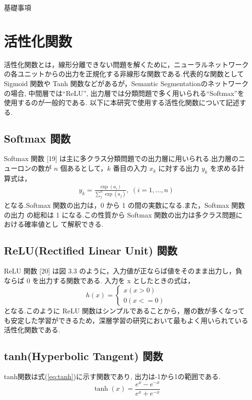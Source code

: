 \appendix
\begin{chapter}{基礎事項}
\section{活性化関数}\label{hu:ac_fn}
活性化関数とは，線形分離できない問題を解くために，ニューラルネットワークの各ユニットからの出力を正規化する非線形な関数である.代表的な関数として Sigmoid 関数や Tanh 関数などがあるが，Semantic Segmentationのネットワークの場合, 中間層では``ReLU''\cite{relu}, 出力層では分類問題で多く用いられる``Softmax''\cite{softmax}を使用するのが一般的である. 以下に本研究で使用する活性化関数について記述する.  
\subsection*{Softmax 関数}
Softmax 関数 [19] は主に多クラス分類問題での出力層に用いられる.出力層のニューロンの数が $n$ 個あるとして，$k$ 番目の入力 $x_k$ に対する出力 $y_k$ を求める計算式は，
\begin{equation}
    \begin{split}
        y_k = \frac{\exp(a_i)}{\sum_j^n \exp(a_j)},\;(i=1,\ldots,n)
    \end{split}
\end{equation}
となる.Softmax 関数の出力は，0 から 1 の間の実数になる.また，Softmax 関数の出力 の総和は 1 になる.この性質から Softmax 関数の出力は多クラス問題における確率値とし て解釈できる.
\subsection*{ReLU(Rectified Linear Unit) 関数}
ReLU 関数 [20] は図 3.3 のように，入力値が正ならば値をそのまま出力し，負ならば 0 を出力する関数である.
入力を x としたときの式は，
\begin{equation}
h(x) = 
    \begin{cases}
        x  (x>0)\\
        0  (x<=0)
    \end{cases}
\end{equation}
となる.このように ReLU 関数はシンプルであることから，層の数が多くなっても安定した学習ができるため，深層学習の研究において最もよく用いられている活性化関数である.

\subsection*{tanh(Hyperbolic Tangent) 関数}
tanh関数は式(\ref{eq:tanh})に示す関数であり, 出力は-1から1の範囲である.
\begin{equation}
\tanh(x) = \frac{e^{x}-e^{-x}}{e^{x}+e^{-x}} \label{eq:tanh}
\end{equation}


\end{chapter}

